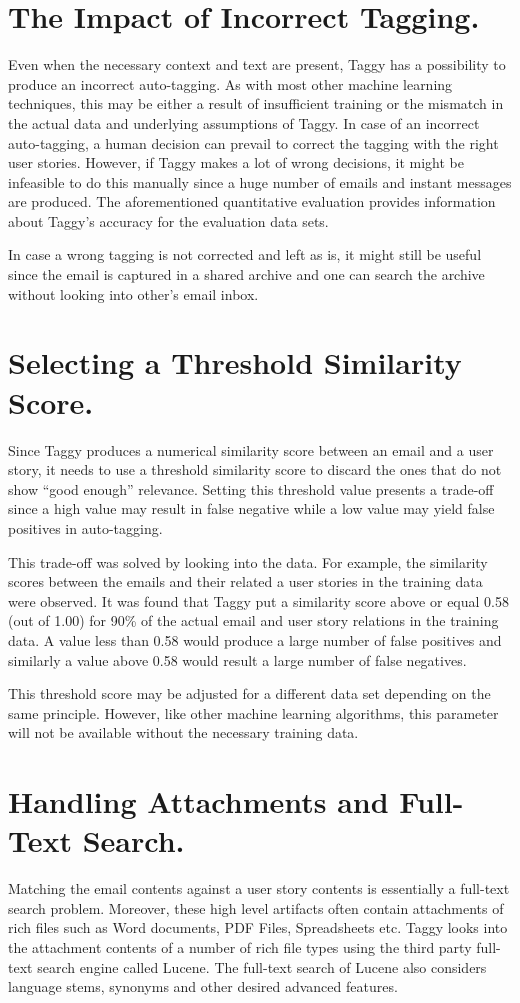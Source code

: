 \section{The Impact of Incorrect Tagging.}
Even when the necessary context and text are present, Taggy has a possibility to produce an incorrect auto-tagging. As with most other machine learning techniques, this may be either a result of insufficient training or the mismatch in the actual data and underlying assumptions of Taggy. In case of an incorrect auto-tagging, a human decision can prevail to correct the tagging with the right user stories. However, if Taggy makes a lot of wrong decisions, it might be infeasible to do this manually since a huge number of emails and instant messages are produced. The aforementioned quantitative evaluation provides information about Taggy's accuracy for the evaluation data sets.

In case a wrong tagging is not corrected and left as is, it might still be useful since the email is captured in a shared archive and one can search the archive without looking into other's email inbox.

\section{Selecting a Threshold Similarity Score.}
Since Taggy produces a numerical similarity score between an email and a user story, it needs to use a threshold similarity score to discard the ones that do not show ``good enough'' relevance. Setting this threshold value presents a trade-off since a high value may result in false negative while a low value may yield false positives in auto-tagging.

This trade-off was solved by looking into the data. For example, the similarity scores between the emails and their related a user stories in the training data were observed. It was found that Taggy put a similarity score above or equal 0.58 (out of 1.00) for 90\% of the actual email and user story relations in the training data. A value less than 0.58 would produce a large number of false positives and similarly a value above 0.58 would result a large number of false negatives.

This threshold score may be adjusted for a different data set depending on the same principle. However, like other machine learning algorithms, this parameter will not be available without the necessary training data.

\section{Handling Attachments and Full-Text Search.}
Matching the email contents against a user story contents is essentially a full-text search problem. Moreover, these high level artifacts often contain attachments of rich files such as Word documents, PDF Files, Spreadsheets etc. Taggy looks into the attachment contents of a number of rich file types using the third party full-text search engine called Lucene. The full-text search of Lucene also considers language stems, synonyms and other desired advanced features.

